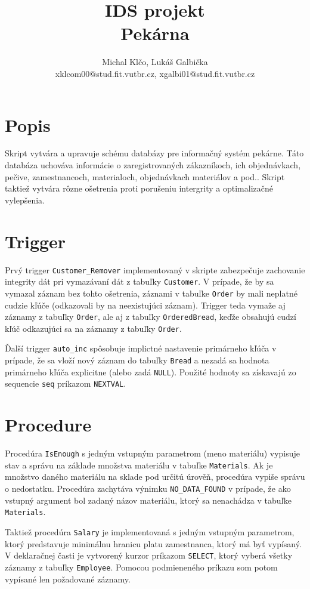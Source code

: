 \documentclass[11pt,a4paper]{article}
\title{IDS projekt\\[0pt]Pekárna}
\author{Michal Klčo, Lukáš Galbička\\[0pt]xklcom00@stud.fit.vutbr.cz, xgalbi01@stud.fit.vutbr.cz}
\date{}
\begin{document}
\maketitle
\section*{Popis}
Skript vytvára a upravuje schému databázy pre informačný systém pekárne. Táto databáza uchováva informácie o zaregistrovaných zákazníkoch, ich objednávkach, pečive, zamestnancoch, materialoch, objednávkach materiálov a pod.. Skript taktiež vytvára rôzne ošetrenia proti porušeniu intergrity a optimalizačné vylepšenia.

\section*{Trigger}
Prvý trigger \texttt{Customer\_Remover} implementovaný v skripte zabezpečuje zachovanie integrity dát pri vymazávaní dát z tabuľky \texttt{Customer}. V prípade, že by sa vymazal záznam bez tohto ošetrenia, záznami v tabuľke \texttt{Order} by mali neplatné cudzie kľúče (odkazovali by na neexistujúci záznam). Trigger teda vymaže aj záznamy z tabuľky \texttt{Order}, ale aj z tabuľky \texttt{OrderedBread}, keďže obsahujú cudzí kľúč odkazujúci sa na záznamy z tabuľky \texttt{Order}. 

Ďalší trigger \texttt{auto\_inc} spôsobuje implictné nastavenie primárneho kľúča v prípade, že sa vloží nový záznam do tabuľky \texttt{Bread} a nezadá sa hodnota primárneho kľúča explicitne (alebo zadá \texttt{NULL}). Použité hodnoty sa získavajú zo sequencie \texttt{seq} príkazom \texttt{NEXTVAL}.

\section*{Procedure}
Procedúra \texttt{IsEnough} s jedným vstupným parametrom (meno materiálu) vypisuje stav a správu na základe množstva materiálu v tabuľke \texttt{Materials}. Ak je množstvo daného materiálu na sklade pod určitú úrověň, procedúra vypiše správu o nedostatku. Procedúra zachytáva výnimku \texttt{NO\_DATA\_FOUND} v prípade, že ako vstupný argument bol zadaný názov materiálu, ktorý sa nenachádza v tabuľke \texttt{Materials}.

Taktiež procedúra \texttt{Salary} je implementovaná s jedným vstupným parametrom, ktorý predstavuje minimálnu hranicu platu zamestnanca, ktorý má byť vypísaný. V deklaračnej časti je vytvorený kurzor príkazom \texttt{SELECT}, ktorý vyberá všetky záznamy z tabuľky \texttt{Employee}. Pomocou podmieneného príkazu som potom vypísané len požadované záznamy.
\end{document}
